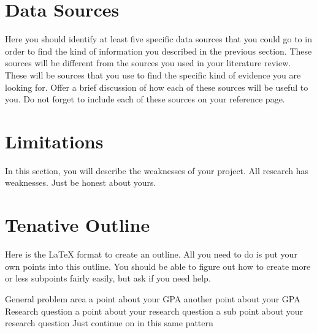 \documentclass{article}
\begin{document}
\section{Data Sources}
Here you should identify at least five specific data sources that you could go to in order to find the kind of information you described in the previous section. These sources will be different from the sources you used in your literature review. These will be sources that you use to find the specific kind of evidence you are looking for. Offer a brief discussion of how each of these sources will be useful to you. Do not forget to include each of these sources on your reference page.

\section{Limitations}
In this section, you will describe the weaknesses of your project. All research has weaknesses. Just be honest about yours.

\section{Tenative Outline}
Here is the \LaTeX{} format to create an outline. All you need to do is put your own points into this outline. You should be able to figure out how to create more or less subpoints fairly easily, but ask if you need help.

\begin{outline}
\1 General problem area
    \2 a point about your GPA
    \2 another point about your GPA
\1 Research question
    \2 a point about your research question
        \3 a sub point about your research question
\1 Just continue on in this same pattern
\end{outline}







\printbibliography
\end{document}
